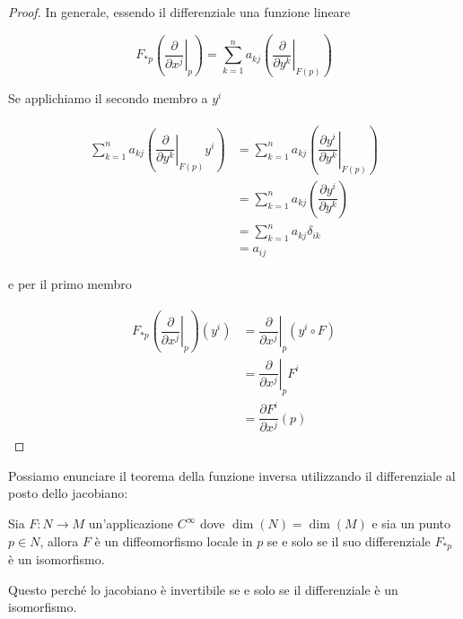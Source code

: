 \begin{proof}
	In generale, essendo il differenziale una funzione lineare
	
	\begin{equation}
		F_{*p} \left( \left. \dfrac{\partial}{\partial x^{j}} \right|_{p} \right) = \sum_{k=1}^{n} a_{kj} \left( \left. \dfrac{\partial}{\partial y^{k}} \right|_{F(p)} \right)
	\end{equation}
	
	Se applichiamo il secondo membro a $ y^{i} $
	
	\begin{align}
		\begin{split}
			\sum_{k=1}^{n} a_{kj} \left( \left. \dfrac{\partial}{\partial y^{k}} \right|_{F(p)} y^{i} \right) &= \sum_{k=1}^{n} a_{kj} \left( \left. \dfrac{\partial y^{i}}{\partial y^{k}} \right|_{F(p)} \right)\\
			&= \sum_{k=1}^{n} a_{kj} \left( \dfrac{\partial y^{i}}{\partial y^{k}} \right)\\
			&= \sum_{k=1}^{n} a_{kj} \delta_{ik}\\
			&= a_{ij}
		\end{split}
	\end{align}
	
	e per il primo membro
	
	\begin{align}
		\begin{split}
			F_{*p} \left( \left. \dfrac{\partial}{\partial x^{j}} \right|_{p} \right) (y^{i}) &= \left. \dfrac{\partial}{\partial x^{j}} \right|_{p} (y^{i} \circ F)\\
			&= \left. \dfrac{\partial}{\partial x^{j}} \right|_{p} F^{i}\\
			&= \dfrac{\partial F^{i}}{\partial x^{j}} (p)
		\end{split}
	\end{align}
\end{proof}

\begin{remark}
	Possiamo enunciare il teorema della funzione inversa utilizzando il differenziale al posto dello jacobiano:
	
	\begin{theorem}
		Sia $ F : N \to M $ un'applicazione $ C^{\infty} $ dove $ \dim(N) = \dim(M) $ e sia un punto $ p \in N $, allora $ F $ è un diffeomorfismo locale in $ p $ se e solo se il suo differenziale $ F_{*p} $ è un isomorfismo.
	\end{theorem}

	Questo perché lo jacobiano è invertibile se e solo se il differenziale è un isomorfismo.
\end{remark}


